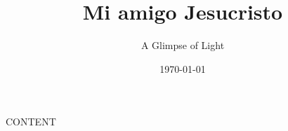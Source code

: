 \documentclass[11pt,a5paper]{book}
\title{Mi amigo Jesucristo}
\author{A Glimpse of Light}
\date{\today}
\begin{document}
\maketitle
\tableofcontents

{{CONTENT}}
\end{document}
